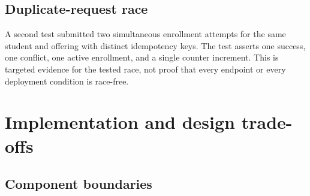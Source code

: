 \documentclass[11pt,a4paper,oneside]{report}
\begin{document}
\section{Duplicate-request race}
A second test submitted two simultaneous enrollment attempts for the same student and offering with distinct idempotency keys. The test asserts one success, one conflict, one active enrollment, and a single counter increment. This is targeted evidence for the tested race, not proof that every endpoint or every deployment condition is race-free.

\chapter{Implementation and design trade-offs}
\section{Component boundaries}
\end{document}
